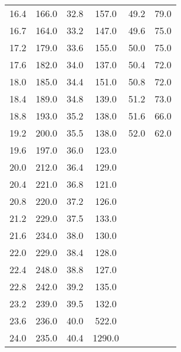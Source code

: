 \begin{table}[H]
\begin{tabular}{c c | c c | c c}
        16.4  &	  166.0   &  32.8	&  157.0  & 49.2  &  79.0  \\
        16.7  &	  164.0   &  33.2	&  147.0  & 49.6  &  75.0  \\
        17.2  &	  179.0   &  33.6	&  155.0  & 50.0  &  75.0  \\
        17.6  &	  182.0   &  34.0	&  137.0  & 50.4  &  72.0  \\
        18.0  &	  185.0   &  34.4	&  151.0  & 50.8  &  72.0  \\
        18.4  &	  189.0   &  34.8	&  139.0  & 51.2  &  73.0  \\
        18.8  &	  193.0   &  35.2	&  138.0  & 51.6  &  66.0  \\
        19.2  &	  200.0   &  35.5	&  138.0  & 52.0  &  62.0  \\
        19.6  &	  197.0   &  36.0	&  123.0  &       &      \\
        20.0  &	  212.0   &  36.4	&  129.0  &       &      \\
        20.4  &	  221.0   &  36.8	&  121.0  &       &      \\
        20.8  &	  220.0   &  37.2	&  126.0  &       &      \\
        21.2  &	  229.0   &  37.5	&  133.0  &       &      \\
        21.6  &	  234.0   &  38.0	&  130.0  &       &      \\
        22.0  &	  229.0   &  38.4	&  128.0  &       &      \\
        22.4  &	  248.0   &  38.8	&  127.0  &       &      \\
        22.8  &	  242.0   &  39.2	&  135.0  &       &      \\ 
        23.2  &	  239.0   &  39.5	&  132.0  &       &      \\
        23.6  &	  236.0   &  40.0	&  522.0  &       &      \\
        24.0  &	  235.0   &  40.4	&  1290.0 &       &      \\                                             
        \bottomrule
    \end{tabular}
\end{table}

